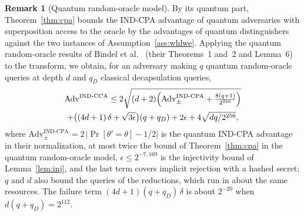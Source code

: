 \documentclass[11pt,a4paper]{article}
\theoremstyle{definition}
\newtheorem{remark}{Remark}
\begin{document}
\begin{remark}[Quantum random-oracle model]\label{rem:qrom}
By its quantum part, Theorem~\ref{thm:cpa} bounds the IND-CPA advantage of quantum adversaries with superposition access to the oracle by the advantages of quantum distinguishers against the two instances of Assumption~\ref{ass:whlwe}. Applying the quantum random-oracle results of Bindel et al.~\cite{bindel2019tighter} (their Theorems~1 and~2 and Lemma~6) to the transform, we obtain, for an adversary making $q$ quantum random-oracle queries at depth $d$ and $q_D$ classical decapsulation queries,
\begin{multline*}
\mathrm{Adv}^{\mathrm{IND\text{-}CCA}} \le 2\sqrt{(d + 2)\Bigl(\mathrm{Adv}^{\mathrm{IND\text{-}CPA}}_{\pm} + \tfrac{8(q+1)}{2^{256}}\Bigr)} \\
+ \bigl((4d + 1)\,\delta + \sqrt{3\epsilon}\bigr)(q + q_D) + 2\epsilon + 4\sqrt{dq/2^{256}},
\end{multline*}
where $\mathrm{Adv}^{\mathrm{IND\text{-}CPA}}_{\pm} = 2\,|\Pr[\theta' = \theta] - 1/2|$ is the quantum IND-CPA advantage in their normalization, at most twice the bound of Theorem~\ref{thm:cpa} in the quantum random-oracle model, $\epsilon \le 2^{-7{,}169}$ is the injectivity bound of Lemma~\ref{lem:inj}, and the last term covers implicit rejection with a hashed secret; $q$ and $d$ also bound the queries of the reductions, which run in about the same resources. The failure term $(4d + 1)(q + q_D)\,\delta$ is about $2^{-20}$ when $d(q + q_D) = 2^{112}$.
\end{remark}
\end{document}
